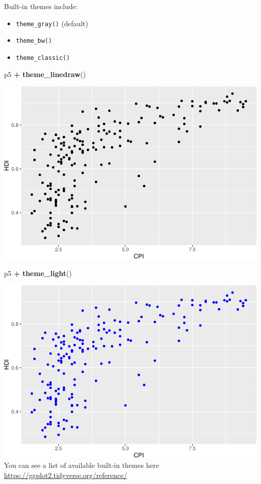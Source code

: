 \documentclass[
]{book}
\newenvironment{Shaded}{\begin{snugshade}}{\end{snugshade}}
\newcommand{\KeywordTok}[1]{\textcolor[rgb]{0.13,0.29,0.53}{\textbf{#1}}}
\newcommand{\NormalTok}[1]{#1}
\newcommand{\OperatorTok}[1]{\textcolor[rgb]{0.81,0.36,0.00}{\textbf{#1}}}
\newcommand{\StringTok}[1]{\textcolor[rgb]{0.31,0.60,0.02}{#1}}
\providecommand{\tightlist}{%
  \setlength{\itemsep}{0pt}\setlength{\parskip}{0pt}}
\begin{document}
Built-in themes include:

\begin{itemize}
\tightlist
\item
  \texttt{theme\_gray()} (default)
\item
  \texttt{theme\_bw()}
\item
  \texttt{theme\_classic()}
\end{itemize}

\begin{Shaded}
\begin{Highlighting}[]
\NormalTok{p5 }\OperatorTok{+}\StringTok{ }\KeywordTok{theme\_linedraw}\NormalTok{()}
\end{Highlighting}
\end{Shaded}

\includegraphics{R/Rgraphics/figures/unnamed-chunk-194-1.pdf}

\begin{Shaded}
\begin{Highlighting}[]
\NormalTok{p5 }\OperatorTok{+}\StringTok{ }\KeywordTok{theme\_light}\NormalTok{()}
\end{Highlighting}
\end{Shaded}

\includegraphics{R/Rgraphics/figures/unnamed-chunk-195-1.pdf}
You can see a list of available built-in themes here \url{https://ggplot2.tidyverse.org/reference/}
\end{document}
